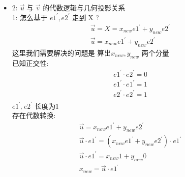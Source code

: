 \documentclass[12pt]{article}
\begin{document}
\begin{flushleft}
\begin{itemize}
              \vspace{0.5em}
        \item 2: $\vec{u} \;\text{与}\; \vec{v} $ 的代数逻辑与几何投影关系  \\
              1: 怎么基于 $e1^{'},e2^{'}$ 走到 X ? \\
              \begin{align}
                  \vec{u} = X = x_{new}e1^{'} + y_{new}e2^{'} \\
                  \vec{u} =  x_{new}e1^{'} + y_{new}e2^{'}
              \end{align}
              这里我们需要解决的问题是 算出$x_{new}, y_{new}$ 两个分量 \\
              已知正交性: \\
              \begin{align}
                  e1^{'} \cdot e2^{'} = 0 \\
                  e1^{'} \cdot e1^{'} = 1 \\
                  e2^{'} \cdot e2^{'} = 1 \\
              \end{align}
              $e1^{'}, e2^{'}$ 长度为1 \\
              存在代数转换: \\
              \begin{align}
                  \vec{u} =  x_{new}e1^{'} + y_{new}e2^{'}                             \\
                  \vec{u} \cdot e1^{'} =  (x_{new}e1^{'} + y_{new}e2^{'}) \cdot e1^{'} \\
                  \vec{u} \cdot e1^{'} =  x_{new}1 + y_{new}0                          \\
                  x_{new} = \vec{u} \cdot e1^{'}
              \end{align}


\end{itemize}
\end{flushleft}
\end{document}
